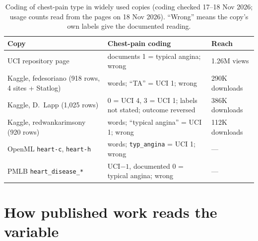 \documentclass[11pt]{article}
\begin{document}
\begin{table}[t]
\centering
\small
\caption{Coding of chest-pain type in widely used copies (coding checked 17--18 Nov 2026; usage counts read from the pages on 18 Nov 2026). ``Wrong'' means the copy's own labels give the documented reading.}\label{tab:spread}
\begin{tabularx}{\linewidth}{lXl}
\toprule
Copy & Chest-pain coding & Reach\\
\midrule
UCI repository page \cite{uciheart} & documents 1 = typical angina; wrong & 1.26M views\\
Kaggle, fedesoriano \cite{kagglefedesoriano} (918 rows, 4 sites + Statlog) & words; ``TA'' = UCI 1; wrong & 290K downloads\\
Kaggle, D.~Lapp \cite{kagglelapp} (1{,}025 rows) & 0 = UCI 4, 3 = UCI 1; labels not stated; outcome reversed & 386K downloads\\
Kaggle, redwankarimsony \cite{kaggleredwan} (920 rows) & words; ``typical angina'' = UCI 1; wrong & 112K downloads\\
OpenML \texttt{heart-c}, \texttt{heart-h} \cite{openml} & words; \texttt{typ\_angina} = UCI 1; wrong & ---\\
PMLB \texttt{heart\_disease\_*} \cite{pmlb} & UCI$-1$, documented 0 = typical angina; wrong & ---\\
\bottomrule
\end{tabularx}
\end{table}

\section{How published work reads the variable}\label{sec:audit}
\end{document}
